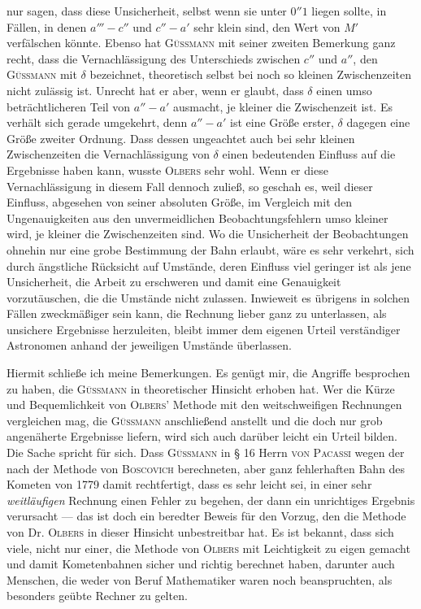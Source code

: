 nur sagen, dass diese Unsicherheit, selbst wenn sie unter $0''1$ liegen sollte, in Fällen, in denen $a'''\!-c''$ und $c''\!-a'$ sehr klein sind, den Wert von $M'$ verfälschen könnte. Ebenso hat \textsc{Güssmann} mit seiner zweiten Bemerkung ganz recht, dass die Vernachlässigung des Unterschieds zwischen $c''$ und $a''$, den \textsc{Güssmann} mit $\delta$ bezeichnet, theoretisch selbst bei noch so kleinen Zwischenzeiten nicht zulässig ist. Unrecht hat er aber, wenn er glaubt, dass $\delta$ einen umso beträchtlicheren Teil von $a''\!-a'$ ausmacht, je kleiner die Zwischenzeit ist. Es verhält sich gerade umgekehrt, denn $a''\!-a'$ ist eine Größe erster, $\delta$ dagegen eine Größe zweiter Ordnung. Dass dessen ungeachtet auch bei sehr kleinen Zwischenzeiten die Vernachlässigung von $\delta$ einen bedeutenden Einfluss auf die Ergebnisse haben kann, wusste \textsc{Olbers} sehr wohl. Wenn er diese Vernachlässigung in diesem Fall dennoch zuließ, so geschah es, weil dieser Einfluss, abgesehen von seiner absoluten Größe, im Vergleich mit den Ungenauigkeiten aus den unvermeidlichen Beobachtungsfehlern umso kleiner wird, je kleiner die Zwischenzeiten sind. Wo die Unsicherheit der Beobachtungen ohnehin nur eine grobe Bestimmung der Bahn erlaubt, wäre es sehr verkehrt, sich durch ängstliche Rücksicht auf Umstände, deren Einfluss viel geringer ist als jene Unsicherheit, die Arbeit zu erschweren und damit eine Genauigkeit vorzutäuschen, die die Umstände nicht zulassen. Inwieweit es übrigens in solchen Fällen zweckmäßiger sein kann, die Rechnung lieber ganz zu unterlassen, als unsichere Ergebnisse herzuleiten, bleibt immer dem eigenen Urteil verständiger Astronomen anhand der jeweiligen Umstände überlassen.

Hiermit schließe ich meine Bemerkungen. Es genügt mir, die Angriffe besprochen zu haben, die \textsc{Güssmann} in theoretischer Hinsicht erhoben hat. Wer die Kürze und Bequemlichkeit von \textsc{Olbers}’ Methode mit den weitschweifigen Rechnungen vergleichen mag, die \textsc{Güssmann} anschließend anstellt und die doch nur grob angenäherte Ergebnisse liefern, wird sich auch darüber leicht ein Urteil bilden. Die Sache spricht für sich. Dass \textsc{Güssmann} in § 16 Herrn \textsc{von Pacassi} wegen der nach der Methode von \textsc{Boscovich} berechneten, aber ganz fehlerhaften Bahn des Kometen von 1779 damit rechtfertigt, dass es sehr leicht sei, in einer sehr \emph{weitläufigen} Rechnung einen Fehler zu begehen, der dann ein unrichtiges Ergebnis verursacht --- das ist doch ein beredter Beweis für den Vorzug, den die Methode von Dr. \textsc{Olbers} in dieser Hinsicht unbestreitbar hat. Es ist bekannt, dass sich viele, nicht nur einer, die Methode von \textsc{Olbers} mit Leichtigkeit zu eigen gemacht und damit Kometenbahnen sicher und richtig berechnet haben, darunter auch Menschen, die weder von Beruf Mathematiker waren noch beanspruchten, als besonders geübte Rechner zu gelten.
